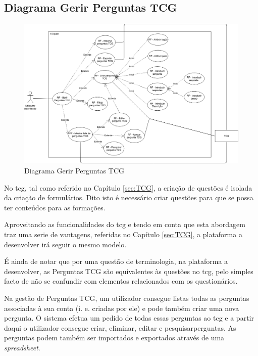 \subsection{Diagrama Gerir Perguntas TCG}
\label{d:perguntastcg}
\begin{figure}[ht!]
	\begin{center}
		\includegraphics[width=1\textwidth]{img/rf/gerir-perguntas-tcg}
		\caption{Diagrama Gerir Perguntas TCG}
		\label{fig:rf-gerir-perguntas-tcg}
	\end{center}
\end{figure}

No \acrshort{tcg}, tal como referido no Capítulo \ref{sec:TCG}, a criação de questões é isolada da criação de formulários. Dito isto é necessário criar questões para que se possa ter conteúdos para as formações. 

Aproveitando as funcionalidades do \acrshort{tcg} e  tendo em conta que esta abordagem traz uma serie de vantagens, referidas no Capítulo \ref{sec:TCG}, a plataforma a desenvolver irá seguir o mesmo modelo. 

É ainda de notar que por uma questão de terminologia, na plataforma a desenvolver, as Perguntas TCG são equivalentes às questões no \acrshort{tcg}, pelo simples facto de não se confundir com elementos relacionados com os questionários.

Na gestão de Perguntas TCG, um utilizador consegue listas todas as perguntas associadas à sua conta (i. e. criadas por ele) e pode também criar uma nova pergunta. O sistema efetua um pedido de todas essas perguntas ao \acrshort{tcg} e a partir daqui o utilizador consegue criar, eliminar, editar e pesquisarperguntas. As perguntas podem também ser importados e exportados através de uma \textit{spreadsheet}.

